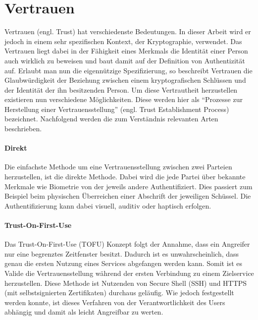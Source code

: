 \section{Vertrauen}
Vertrauen (engl. Trust) hat verschiedenste Bedeutungen. In dieser Arbeit wird er jedoch in einem sehr spezifischen Kontext, der Kryptographie, verwendet. Das Vertrauen liegt dabei in der Fähigkeit eines Merkmals die Identität einer Person auch wirklich zu beweisen und baut damit auf der Definition von Authentizität auf\cite{Perrin2010}. Erlaubt man nun die eigennützige Spezifizierung, so beschreibt Vertrauen die Glaubwürdigkeit der Beziehung zwischen einem kryptografischen Schlüssen und der Identität der ihn besitzenden Person. Um diese Vertrautheit herzustellen existieren nun verschiedene Möglichkeiten. Diese werden hier als ``Prozesse zur Herstellung einer Vertrauensstellung'' (engl. Trust Establishment Process) bezeichnet. Nachfolgend werden die zum Verständnis relevanten Arten beschrieben.

\paragraph{Direkt}
Die einfachste Methode um eine Vertrauensstellung zwischen zwei Parteien herzustellen, ist die direkte Methode. Dabei wird die jede Partei über bekannte Merkmale wie Biometrie von der jeweils andere Authentifiziert. Dies passiert zum Beispiel beim physischen Überreichen einer Abschrift der jeweiligen Schüssel. Die Authentifizierung kann dabei visuell, auditiv oder haptisch erfolgen.

\paragraph{Trust-On-First-Use}
Das Trust-On-First-Use (TOFU) Konzept folgt der Annahme, dass ein Angreifer nur eine begrenztes Zeitfenster besitzt. Dadurch ist es unwahrscheinlich, dass genau die ersten Nutzung eines Services abgefangen werden kann. Somit ist es Valide die Vertrauensstellung während der ersten Verbindung zu einem Zielservice herzustellen. Diese Methode ist Nutzenden von Secure Shell (SSH) und HTTPS (mit selbstsignierten Zertifikaten) durchaus geläufig. Wie jedoch festgestellt werden konnte, ist dieses Verfahren von der Verantwortlichkeit des Users abhängig und damit als leicht Angreifbar zu werten.\cite{Wendlandt2008}

